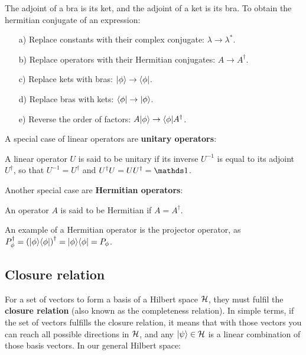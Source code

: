 \begin{itemize}
\begin{enumerate}
    \end{enumerate}
    The adjoint of a bra is its ket, and the adjoint of a ket is its bra.
    To obtain the hermitian conjugate of an expression:
    \begin{enumerate}
        \item[a)] Replace constants with their complex conjugate: $\lambda \to \lambda^*$.
        \item[b)] Replace operators with their Hermitian conjugates: $A\to A^\dagger$.
        \item[c)] Replace kets with bras: $|\phi\rangle\to\langle\phi|$.
        \item[d)] Replace bras with kets: $\langle\phi|\to|\phi\rangle$.
        \item[e)] Reverse the order of factors: $A|\phi\rangle \to \langle\phi|A^\dagger$.

    \end{enumerate}
\end{itemize}

A special case of linear operators are \textbf{unitary operators}:

\begin{definition}
    A linear operator $U$ is said to be unitary if its inverse $U^{-1}$ is equal to its adjoint $U^\dagger$, so that $U^{-1} = U^\dagger$ and $U^\dagger U = UU^\dagger = \Imat$.
\end{definition}

Another special case are \textbf{Hermitian operators}:

\begin{definition}
    An operator $A$ is said to be Hermitian if $A = A^\dagger$.
\end{definition}

An example of a Hermitian operator is the projector operator, as $P_\phi^\dagger = \left(|\phi\rangle\langle\phi|\right)^\dagger = |\phi\rangle\langle\phi| = P_\phi$.

\subsection{Closure relation}

For a set of vectors to form a basis of a Hilbert space $\mathcal{H}$, they must fulfil the \textbf{closure relation} (also known as the completeness relation). In simple terms, if the set of vectors fulfills the closure relation, it means that with those vectors you can reach all possible directions in $\mathcal{H}$, and any $|\psi\rangle\in\mathcal{H}$ is a linear combination of those basis vectors. In our general Hilbert space:

